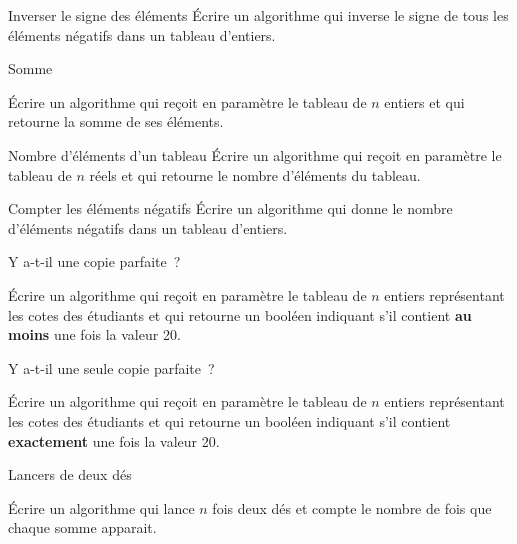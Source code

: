 	\begin{Exercice}{Inverser le signe des éléments}
		Écrire un algorithme qui 
		inverse le signe de tous les éléments négatifs dans un tableau d’entiers.
	\end{Exercice}

	\begin{Exercice}{Somme}

		Écrire un algorithme qui reçoit en paramètre le tableau
		 de $n$ entiers 
		et qui retourne la somme de ses éléments.
	\end{Exercice}

	\begin{Exercice}{Nombre d’éléments d’un tableau}
		Écrire un algorithme qui reçoit en paramètre le tableau
		 de $n$ réels et qui
		retourne le nombre d’éléments du tableau.
	\end{Exercice}

	\begin{Exercice}{Compter les éléments négatifs}
		Écrire un algorithme qui
		donne le nombre d’éléments négatifs dans un tableau d’entiers.
	\end{Exercice}


	\begin{Exercice}{Y a-t-il une copie parfaite~?}

		Écrire un algorithme qui reçoit en paramètre le tableau
		 de $n$ entiers représentant les cotes des étudiants 
		et qui retourne un booléen 
		indiquant s’il contient \textbf{au moins} une fois la valeur 20. 
	\end{Exercice}

	\begin{Exercice}{Y a-t-il une seule copie parfaite~?}

		Écrire un algorithme qui reçoit en paramètre le tableau
		 de $n$ entiers représentant les cotes des étudiants 
		et qui retourne un booléen 
		indiquant s’il contient \textbf{exactement} une fois la valeur 20. 
	\end{Exercice}

	\begin{Exercice}{Lancers de deux dés}

		Écrire un algorithme qui lance $n$ fois deux dés
		et compte le nombre de fois que chaque somme apparait.
		\begin{pseudocode}
		\end{pseudocode}
	\end{Exercice}

